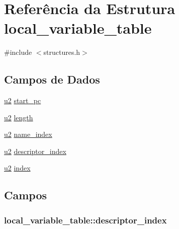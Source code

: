\hypertarget{structlocal__variable__table}{}\section{Referência da Estrutura local\+\_\+variable\+\_\+table}
\label{structlocal__variable__table}


{\ttfamily \#include $<$structures.\+h$>$}

\subsection*{Campos de Dados}
\begin{DoxyCompactItemize}
\item 
\hyperlink{lista__operandos_8h_a732cde1300aafb73b0ea6c2558a7a54f}{u2} \hyperlink{structlocal__variable__table_aa86e910619df9b3284535529bc887a12}{start\+\_\+pc}
\item 
\hyperlink{lista__operandos_8h_a732cde1300aafb73b0ea6c2558a7a54f}{u2} \hyperlink{structlocal__variable__table_a76b778cea6d99b0854cba21e223569cc}{length}
\item 
\hyperlink{lista__operandos_8h_a732cde1300aafb73b0ea6c2558a7a54f}{u2} \hyperlink{structlocal__variable__table_a6c91f7b672683a35b1433c429de69069}{name\+\_\+index}
\item 
\hyperlink{lista__operandos_8h_a732cde1300aafb73b0ea6c2558a7a54f}{u2} \hyperlink{structlocal__variable__table_adb823a30762d64e9d20f674ae7923bfc}{descriptor\+\_\+index}
\item 
\hyperlink{lista__operandos_8h_a732cde1300aafb73b0ea6c2558a7a54f}{u2} \hyperlink{structlocal__variable__table_af13a15b5fbb398323997b88d341a6c38}{index}
\end{DoxyCompactItemize}


\subsection{Campos}
\subsubsection[{\texorpdfstring{descriptor\+\_\+index}{descriptor_index}}]{ local\+\_\+variable\+\_\+table\+::descriptor\+\_\+index}\hypertarget{structlocal__variable__table_adb823a30762d64e9d20f674ae7923bfc}{}\label{structlocal__variable__table_adb823a30762d64e9d20f674ae7923bfc}

